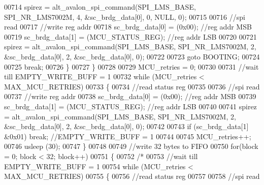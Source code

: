 \begin{DoxyCode}
00714                                 spirez = alt_avalon_spi_command(SPI_LMS_BASE, 
      SPI_NR_LMS7002M, 4, &sc_brdg_data[0], 0, NULL, 0);
00715 
00716                                 \textcolor{comment}{//spi read}
00717                                 \textcolor{comment}{//write reg addr}
00718                                 sc_brdg_data[0] = (0x00); \textcolor{comment}{//reg addr MSB}
00719                                 sc_brdg_data[1] = (MCU_STATUS_REG); \textcolor{comment}{//reg addr LSB}
00720 
00721                                 spirez = alt_avalon_spi_command(SPI_LMS_BASE, 
      SPI_NR_LMS7002M, 2, &sc_brdg_data[0], 2, &sc_brdg_data[0], 0);
00722 
00723                                 \textcolor{keywordflow}{goto} BOOTING;
00724 
00725                                 \textcolor{keywordflow}{break};
00726                         \}
00727                     \}
00728 
00729                     MCU_retries = 0;
00730 
00731                     \textcolor{comment}{//wait till EMPTY\_WRITE\_BUFF = 1}
00732                     \textcolor{keywordflow}{while} (MCU_retries < MAX_MCU_RETRIES)
00733                     \{
00734                         \textcolor{comment}{//read status reg}
00735 
00736                         \textcolor{comment}{//spi read}
00737                         \textcolor{comment}{//write reg addr}
00738                         sc_brdg_data[0] = (0x00); \textcolor{comment}{//reg addr MSB}
00739                         sc_brdg_data[1] = (MCU_STATUS_REG); \textcolor{comment}{//reg addr LSB}
00740 
00741                         spirez = alt_avalon_spi_command(SPI_LMS_BASE, 
      SPI_NR_LMS7002M, 2, &sc_brdg_data[0], 2, &sc_brdg_data[0], 0);
00742 
00743                         \textcolor{keywordflow}{if} (sc_brdg_data[1] &0x01) \textcolor{keywordflow}{break}; \textcolor{comment}{//EMPTY\_WRITE\_BUFF = 1}
00744 
00745                         MCU_retries++;
00746                         usleep (30);
00747                     \}
00748 
00749                     \textcolor{comment}{//write 32 bytes to FIFO}
00750                     \textcolor{keywordflow}{for}(block = 0; block < 32; block++)
00751                     \{
00752                         \textcolor{comment}{/*}
00753 \textcolor{comment}{                        //wait till EMPTY\_WRITE\_BUFF = 1}
00754 \textcolor{comment}{                        while (MCU\_retries < MAX\_MCU\_RETRIES)}
00755 \textcolor{comment}{                        \{}
00756 \textcolor{comment}{                            //read status reg}
00757 \textcolor{comment}{}
00758 \textcolor{comment}{                            //spi read}

\end{DoxyCode}
